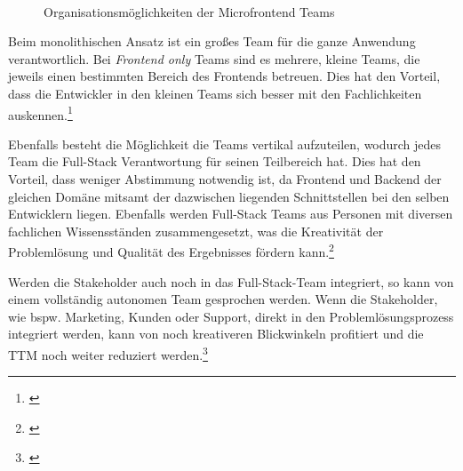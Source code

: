 \begin{figure}[hbt!]
	\centering
	\begin{minipage}[t]{0.85\textwidth}	
		\caption{Organisationsmöglichkeiten der Microfrontend Teams}
		\\
		\label{fig:TeamDepth}
	\end{minipage}
\end{figure}

Beim monolithischen Ansatz ist ein großes Team für die ganze Anwendung verantwortlich. Bei \textit{Frontend only} Teams sind es mehrere, kleine Teams, die jeweils einen bestimmten Bereich des Frontends betreuen. Dies hat den Vorteil, dass die Entwickler in den kleinen Teams sich besser mit den Fachlichkeiten auskennen.\footnote{\cite[vgl.][241]{Geers2020}}

Ebenfalls besteht die Möglichkeit die Teams vertikal aufzuteilen, wodurch jedes Team die Full-Stack Verantwortung für seinen Teilbereich hat. Dies hat den Vorteil, dass weniger Abstimmung notwendig ist, da Frontend und Backend der gleichen Domäne mitsamt der dazwischen liegenden Schnittstellen bei den selben Entwicklern liegen. Ebenfalls werden Full-Stack Teams aus Personen mit diversen fachlichen Wissensständen zusammengesetzt, was die Kreativität der Problemlösung und Qualität des Ergebnisses fördern kann.\footnote{\cite[vgl.][241]{Geers2020}}

Werden die Stakeholder auch noch in das Full-Stack-Team integriert, so kann von einem vollständig autonomen Team gesprochen werden. Wenn die Stakeholder, wie bspw. Marketing, Kunden oder Support, direkt in den Problemlösungsprozess integriert werden, kann von noch kreativeren Blickwinkeln profitiert und die \gls{TTM} noch weiter reduziert werden.\footnote{\cite[vgl.][242]{Geers2020}}

